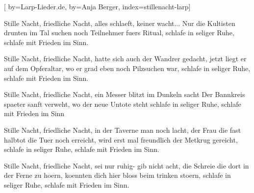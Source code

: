 
[%
    by={Larp-Lieder.de},
    by={Anja Berger},
    index={stillenacht-larp}]


    \label{stillenacht-larp}

    \beginverse
        Stille Nacht, friedliche Nacht,
        alles schlaeft, keiner wacht...
        Nur die Kultisten drunten im Tal
        suchen noch Teilnehmer fuers Ritual,
        schlafe in seliger Ruhe,
        schlafe mit Frieden im Sinn.
    \endverse

    \beginverse
        Stille Nacht, friedliche Nacht,
        hatte sich auch der Wandrer gedacht,
        jetzt liegt er auf dem Opferaltar,
        wo er grad eben noch Pilzsuchen war,
        schlafe in seliger Ruhe,
        schlafe mit Frieden im Sinn.
    \endverse

    \beginverse
        Stille Nacht, friedliche Nacht,
        ein Messer blitzt im Dunkeln sacht
        Der Bannkreis spaeter sanft verweht,
        wo der neue Untote steht
        schlafe in seliger Ruhe,
        schlafe mit Frieden im Sinn
    \endverse

    \beginverse
        Stille Nacht, friedliche Nacht,
        in der Taverne man noch lacht,
        der Frau die fast halbtot die Tuer noch erreicht,
        wird erst mal freundlich der Metkrug gereicht,
        schlafe in seliger Ruhe,
        schlafe mit Frieden im Sinn.
    \endverse

    \beginverse
        Stille Nacht, friedliche Nacht,
        sei nur ruhig- gib nicht acht,
        die Schreie die dort in der Ferne zu hoern,
        koennten dich hier bloss beim trinken stoern,
        schlafe in seliger Ruhe,
        schlafe mit Frieden im Sinn.
    \endverse
\endsong
